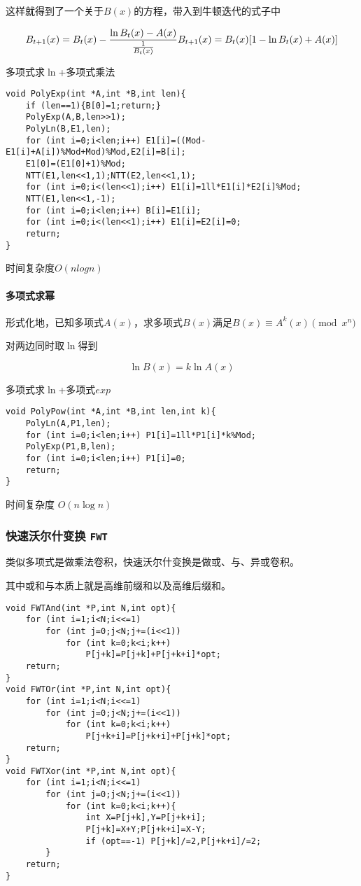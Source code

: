 \documentclass[UTF-8]{ctexart}
\begin{document}
	这样就得到了一个关于$B(x)$的方程，带入到牛顿迭代的式子中
	
	$$B _ {t+1}(x)=B _ t(x)-\frac{\ln{B _ t(x)}-A(x)}{\frac{1}{B _ t(x)}} \\\\ B _ {t+1}(x)=B _ t(x)[1-\ln{B _ t(x)}+A(x)]$$
	
	多项式求$\ln$+多项式乘法
	
\begin{verbatim}
void PolyExp(int *A,int *B,int len){
    if (len==1){B[0]=1;return;}
    PolyExp(A,B,len>>1);
    PolyLn(B,E1,len);
    for (int i=0;i<len;i++) E1[i]=((Mod-E1[i]+A[i])%Mod+Mod)%Mod,E2[i]=B[i];
    E1[0]=(E1[0]+1)%Mod;
    NTT(E1,len<<1,1);NTT(E2,len<<1,1);
    for (int i=0;i<(len<<1);i++) E1[i]=1ll*E1[i]*E2[i]%Mod;
    NTT(E1,len<<1,-1);
    for (int i=0;i<len;i++) B[i]=E1[i];
    for (int i=0;i<(len<<1);i++) E1[i]=E2[i]=0;
    return;
}
\end{verbatim}
	
	时间复杂度$O(nlogn)$
	\paragraph{多项式求幂} 形式化地，已知多项式$A(x)$，求多项式$B(x)$满足$B(x) \equiv A^k(x) \pmod{x^n}$  
	
	对两边同时取$\ln$得到
	
	$$\ln{B(x)}=k \ln{A(x)}$$
	
	多项式求$\ln$+多项式$exp$
	
\begin{verbatim}
void PolyPow(int *A,int *B,int len,int k){
    PolyLn(A,P1,len);
    for (int i=0;i<len;i++) P1[i]=1ll*P1[i]*k%Mod;
    PolyExp(P1,B,len);
    for (int i=0;i<len;i++) P1[i]=0;
    return;
}
\end{verbatim}
	时间复杂度 $O(n\log n)$
	\subsubsection{快速沃尔什变换 \texttt{FWT}}
	类似多项式是做乘法卷积，快速沃尔什变换是做或、与、异或卷积。
	
	其中或和与本质上就是高维前缀和以及高维后缀和。
\begin{verbatim}
void FWTAnd(int *P,int N,int opt){
    for (int i=1;i<N;i<<=1)
        for (int j=0;j<N;j+=(i<<1))
            for (int k=0;k<i;k++)
                P[j+k]=P[j+k]+P[j+k+i]*opt;
    return;
}
void FWTOr(int *P,int N,int opt){
    for (int i=1;i<N;i<<=1)
        for (int j=0;j<N;j+=(i<<1))
            for (int k=0;k<i;k++)
                P[j+k+i]=P[j+k+i]+P[j+k]*opt;
    return;
}
void FWTXor(int *P,int N,int opt){
    for (int i=1;i<N;i<<=1)
        for (int j=0;j<N;j+=(i<<1))
            for (int k=0;k<i;k++){
                int X=P[j+k],Y=P[j+k+i];
                P[j+k]=X+Y;P[j+k+i]=X-Y;
                if (opt==-1) P[j+k]/=2,P[j+k+i]/=2;
        }
    return;
}
\end{verbatim}
	\newpage
\end{document}
